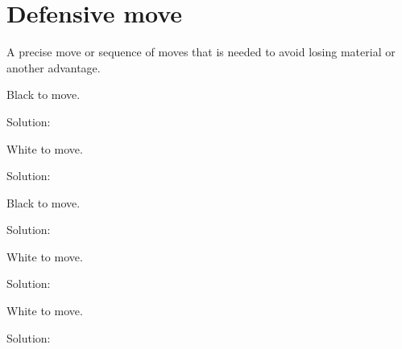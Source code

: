 \documentclass{book}
\begin{document}
\section{Defensive move}
A precise move or sequence of moves that is needed to avoid losing material or another advantage.\begin{multicols}{2} 
\begin{samepage} 
\newgame 


 
\showboard
 
 Black to move. 
 
Solution: 
 
\end{samepage}\begin{samepage} 
\newgame 


 
\showboard
 
 White to move. 
 
Solution: 
 
\end{samepage}\begin{samepage} 
\newgame 


 
\showboard
 
 Black to move. 
 
Solution: 
 
\end{samepage}\begin{samepage} 
\newgame 


 
\showboard
 
 White to move. 
 
Solution: 
 
\end{samepage}\begin{samepage} 
\newgame 


 
\showboard
 
 White to move. 
 
Solution: 
 
\end{samepage}\end{multicols} 
\newpage 
\end{document}
